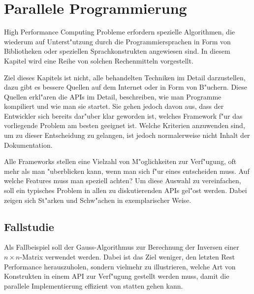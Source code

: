 \chapter{Parallele Programmierung}
High Performance Computing Probleme erfordern spezielle Algorithmen, die
wiederum auf Unterst"utzung durch die Programmiersprachen in Form von
Bibliotheken oder speziellen Sprachkonstrukten angewiesen sind.
In diesem Kapitel wird eine Reihe von solchen Rechenmitteln vorgestellt.

Ziel dieses Kapitels ist nicht, alle behandelten Techniken im Detail
darzustellen, dazu gibt es bessere Quellen auf dem Internet oder in
Form von B"uchern.
Diese Quellen erkl"aren die APIs im Detail, beschreiben, wie man Programme
kompiliert und wie man sie startet. Sie gehen jedoch davon aus, dass der
Entwickler sich bereits dar"uber klar geworden ist, welches Framework
f"ur das vorliegende Problem am besten geeignet ist.
Welche Kriterien anzuwenden sind, um zu dieser Entscheidung zu gelangen,
ist jedoch normalerweise nicht Inhalt der Dokumentation.

Alle Frameworks stellen eine Vielzahl von M"oglichkeiten zur
Verf"ugung, oft mehr als man "uberblicken kann, wenn man sich f"ur
eines entscheiden muss.
Auf welche Features muss man speziell achten? Um diese Auswahl
zu vereinfachen, soll ein typisches Problem in allen zu diskutierenden
APIs gel"ost werden. Dabei zeigen sich St"arken und Schw"achen  in
exemplarischer Weise.

\section{Fallstudie}
Als Fallbeispiel soll der Gauss-Algorithmus zur Berechnung der Inversen
einer $n\times n$-Matrix verwendet werden. Dabei ist das Ziel weniger,
den letzten Rest Performance herauszuholen, sondern vielmehr zu
illustrieren, welche Art von Konstrukten in einem API zur Verf"ugung
gestellt werden muss, damit die parallele Implementierung effizient
von statten gehen kann.

